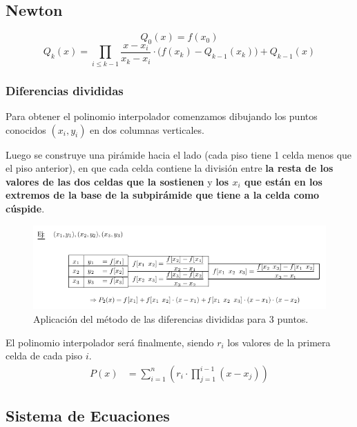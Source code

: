 \documentclass[spanish, fleqn]{article}
\begin{document}
\subsection{Newton}

\[Q_0(x) = f(x_0)\]
\[Q_k(x) = \prod_{i \leqslant k - 1} \frac{x-x_i}{x_k - x_i} \cdot \bigg(f(x_k) - Q_{k-1}(x_k)\bigg) + Q_{k-1}(x) \]

\subsubsection{Diferencias divididas}

Para obtener el polinomio interpolador comenzamos dibujando los puntos conocidos $(x_i,y_i)$ en dos columnas verticales.

Luego se construye una pirámide hacia el lado (cada piso tiene 1 celda menos que el piso anterior), en que cada celda contiene la división entre \textbf{la resta de los valores de las dos celdas que la sostienen} y \textbf{los $x_i$ que están en los extremos de la base de la subpirámide que tiene a la celda como cúspide}.

\begin{figure}[H]
\centering
\includegraphics[scale=0.56]{dif_divididas}
\caption{Aplicación del método de las diferencias divididas para 3 puntos.}
\end{figure}

El polinomio interpolador será finalmente, siendo $r_i$ los valores de la primera celda de cada piso $i$.
\begin{align*}
P(x) &= \sum_{i=1}^{n} \left(r_i \cdot \prod_{j=1}^{i-1}(x-x_j)\right)
\end{align*}

\subsection{Sistema de Ecuaciones}
\end{document}
